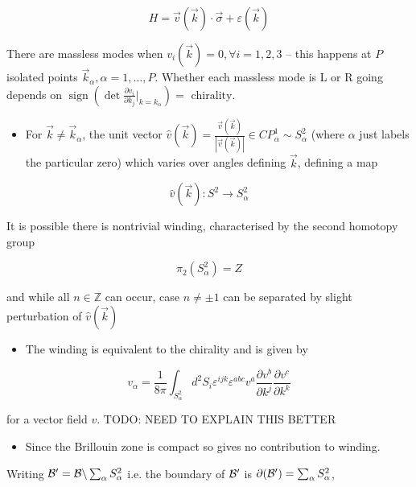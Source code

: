 \begin{equation}
H=\vec{v}(\vec{k}) \cdot \vec{\sigma}+\varepsilon(\vec{k})
\end{equation}

There are massless modes when $v_i(\vec{k}) = 0, \forall i = 1,2,3$ -- this happens at $P$ isolated points $\vec{k}_\alpha, \alpha = 1,\ldots, P$. Whether each massless mode is L or R going depends on $\operatorname{sign}(\operatorname{det}\frac{\partial v_i}{\partial k_j}|_{k = k_\alpha})= \text{ chirality.}$

\begin{itemize}
  \item For \(\vec{k} \neq \vec{k}_{\alpha}\), the unit vector \(\hat{v}(\vec{k})=\frac{\vec{v}(\vec{k})}{|\vec{v}(\vec{k})|} \in C P_{\alpha}^{1} \sim S_{\alpha}^{2}\) (where $\alpha$ just labels the particular zero) which varies over angles defining $\vec{k}$, defining a map
\end{itemize}

\begin{equation}
\hat{v}(\vec{k}): S^{2} \rightarrow S_{\alpha}^{2}
\end{equation}

It is possible there is nontrivial winding, characterised by the second homotopy group

\begin{equation}
\pi_{2}\left(S_{\alpha}^{2}\right)=Z
\end{equation}

and while all \(n \in \mathbb{Z}\) can occur, case \(n \neq \pm 1\) can be separated by slight perturbation of $\hat{v}(\vec{k})$

\begin{itemize}
  \item The winding is equivalent to the chirality and is given by
\end{itemize}

\begin{equation}
v_{\alpha}=\frac{1}{8 \pi} \int_{S_{\alpha}^{2}} d^{2} S_{i} \varepsilon^{i j k} \varepsilon^{a b c} v^{a} \frac{\partial v^{b}}{\partial k^{j}} \frac{\partial v^{c}}{\partial k^{k}}
\end{equation}

for a vector field \(v\). TODO: NEED TO EXPLAIN THIS BETTER

\begin{itemize}
  \item Since the Brillouin zone is compact so gives no contribution to winding.
\end{itemize}
Writing ${\cal B}^\prime = {\cal B} \backslash\sum_\alpha S_\alpha^2$ i.e. the boundary of ${\cal B}^\prime$ is $\partial({\cal B}^\prime) = \sum_\alpha S_\alpha^2$,

